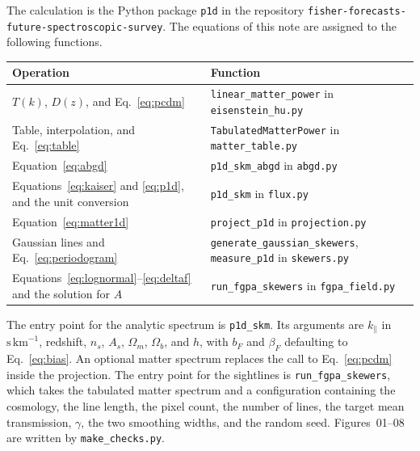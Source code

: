 \documentclass[11pt]{article}
\begin{document}
The calculation is the Python package \texttt{p1d} in the repository \texttt{fisher-forecasts-future-spectroscopic-survey}.
The equations of this note are assigned to the following functions.

\begin{center}
\small
\begin{tabular}{@{}p{}p{}@{}}
\toprule
Operation & Function \\
\midrule
$T(k)$, $D(z)$, and Eq.~\eqref{eq:pcdm} &
\texttt{linear\_matter\_power} in \texttt{eisenstein\_hu.py} \\
Table, interpolation, and Eq.~\eqref{eq:table} &
\texttt{TabulatedMatterPower} in \texttt{matter\_table.py} \\
Equation~\eqref{eq:abgd} &
\texttt{p1d\_skm\_abgd} in \texttt{abgd.py} \\
Equations~\eqref{eq:kaiser} and \eqref{eq:p1d}, and the unit conversion &
\texttt{p1d\_skm} in \texttt{flux.py} \\
Equation~\eqref{eq:matter1d} &
\texttt{project\_p1d} in \texttt{projection.py} \\
Gaussian lines and Eq.~\eqref{eq:periodogram} &
\texttt{generate\_gaussian\_skewers}, \texttt{measure\_p1d} in \texttt{skewers.py} \\
Equations~\eqref{eq:lognormal}--\eqref{eq:deltaf} and the solution for $A$ &
\texttt{run\_fgpa\_skewers} in \texttt{fgpa\_field.py} \\
\bottomrule
\end{tabular}
\end{center}

\noindent
The entry point for the analytic spectrum is \texttt{p1d\_skm}.
Its arguments are $k_\parallel$ in $\mathrm{s\,km}^{-1}$, redshift, $n_s$, $A_s$, $\Omega_m$, $\Omega_b$, and $h$, with $b_F$ and $\beta_F$ defaulting to Eq.~\eqref{eq:bias}.
An optional matter spectrum replaces the call to Eq.~\eqref{eq:pcdm} inside the projection.
The entry point for the sightlines is \texttt{run\_fgpa\_skewers}, which takes the tabulated matter spectrum and a configuration containing the cosmology, the line length, the pixel count, the number of lines, the target mean transmission, $\gamma$, the two smoothing widths, and the random seed.
Figures~01--08 are written by \texttt{make\_checks.py}.



\end{document}
